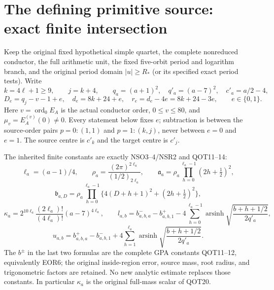 \documentclass[11pt,a4paper]{article}
\begin{document}
\section{The defining primitive source: exact finite intersection}
\label{sec:epr:primitive}
Keep the original fixed hypothetical simple quartet, the complete nonreduced
conductor, the full arithmetic unit, the fixed five-orbit period and logarithm
branch, and the original period domain $|u|\ge R_*$ (or its specified exact
period tests). Write
\[
 k=4\ell+1\ge9,\qquad j=k+4,\qquad
 q_a=(a+1)^2,\quad q'_a=(a-7)^2,\quad c'_a=a/2-4,
\]
\[
 D_e=q_j-v-1+e,\quad d_e=8k+24+e,\quad
 r_e=d_e-4e=8k+24-3e,\qquad e\in\{0,1\}.
\]
Here $v=\operatorname{ord}_0E_A$ is the actual conductor order,
$0\le v\le80$, and $\mu_v=E_A^{(v)}(0)\ne0$.
Every statement below fixes $e$; subtraction is between the source-order
pairs $p=0:(1,1)$ and $p=1:(k,j)$, never between $e=0$ and $e=1$.
The source centre is $c'_k$ and the target centre is $c'_j$.

The inherited finite constants are exactly NSO3--4/NSR2 and QOT11--14:
\[
 \ell_a=(a-1)/4,\qquad
 \rho_a=\frac{(2\pi)^{2\ell_a}}{(1/2)_{2\ell_a}},\qquad
 \mathfrak a_a=\rho_a\prod_{h=0}^{\ell_a-1}(2h+\tfrac12)^2,
\]
\[
 \mathfrak b_{a,D}=\rho_a\prod_{h=0}^{\ell_a-1}
       \{4(D+h+1)^2+(2h+\tfrac12)^2\},
\]
\[
 \kappa_a
 =2^{10\ell_a}\frac{(2\ell_a)!}{(4\ell_a)!}(a-7)^{4\ell_a},
 \qquad
 l_{a,b}=b^-_{a,b,a}-b^+_{a,b,1}
       -4\sum_{h=0}^{\ell_a-1}
          \operatorname{arsinh}\sqrt{\frac{b+h+1/2}{2q'_a}},
\]
\[
 u_{a,b}=b^+_{a,b,a}-b^-_{a,b,1}
       +4\sum_{h=1}^{\ell_a}
          \operatorname{arsinh}\sqrt{\frac{b+h+1/2}{2q'_a}}.
\]
The $b^\pm$ in the last two formulas are the complete GPA constants
QOT11--12, equivalently EOR6; the original inside-region error, source
mass, root radius, and trigonometric factors are retained.
No new analytic estimate replaces those constants.
In particular $\kappa_a$ is the original full-mass scalar of QOT20.
\end{document}
